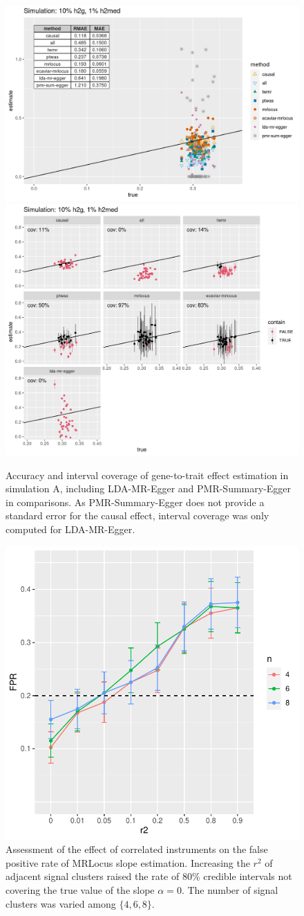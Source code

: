 \documentclass[11pt]{article}
\begin{document}
\begin{figure}[!ht]
  \centering
  \includegraphics[width=.5\textwidth]{figs/sim1extra2.png}
  \includegraphics[width=.4\textwidth]{figs/cover1extra2.png}
  \caption{Accuracy and interval coverage of gene-to-trait effect
    estimation in simulation A, including LDA-MR-Egger and
    PMR-Summary-Egger in comparisons. As PMR-Summary-Egger does not
    provide a standard error for the causal effect, interval
    coverage was only computed for LDA-MR-Egger.}
\end{figure}

\begin{figure}[!ht]
  \centering
  \includegraphics[width=.5\textwidth]{figs/corr_instr_sim}
  \caption{Assessment of the effect of correlated instruments on the
    false positive rate of MRLocus slope estimation. Increasing the
    $r^2$ of adjacent signal clusters raised the rate of 80\% credible
    intervals not covering the true value of the slope $\alpha =
    0$. The number of signal clusters was varied among $\{4,6,8\}$.}
\end{figure}
\end{document}
